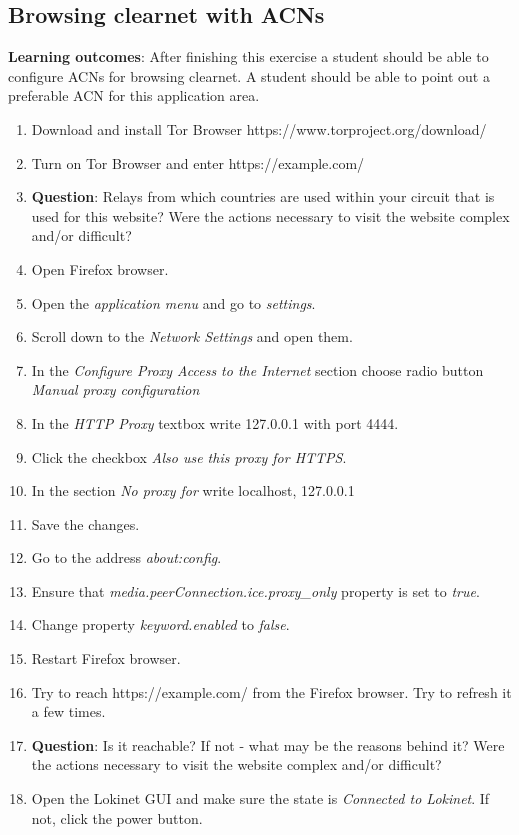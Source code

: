\subsection{Browsing clearnet with ACNs}
\textbf{Learning outcomes}: After finishing this exercise a student should be able to configure ACNs for browsing clearnet. A student should be able to point out a preferable ACN for this application area.
\begin{enumerate}
    \item Download and install Tor Browser https://www.torproject.org/download/
    \item Turn on Tor Browser and enter https://example.com/
    \item \textbf{Question}: Relays from which countries are used within your circuit that is used for this website? Were the actions necessary to visit the website complex and/or difficult?
    \item Open Firefox browser.
    \item Open the \textit{application menu} and go to \textit{settings}.
    \item Scroll down to the \textit{Network Settings} and open them.
    \item In the \textit{Configure Proxy Access to the Internet} section choose radio button \textit{Manual proxy configuration }
    \item In the \textit{HTTP Proxy} textbox write 127.0.0.1 with port 4444.
    \item Click the checkbox \textit{Also use this proxy for HTTPS}.
    \item In the section \textit{No proxy for} write localhost, 127.0.0.1
    \item Save the changes.
    \item Go to the address \textit{about:config}.
    \item Ensure that \textit{media.peerConnection.ice.proxy\_only} property is set to \textit{true}.
    \item Change property \textit{keyword.enabled} to \textit{false}.
    \item Restart Firefox browser.
    \item Try to reach https://example.com/ from the Firefox browser. Try to refresh it a few times.
    \item \textbf{Question}: Is it reachable? If not - what may be the reasons behind it? Were the actions necessary to visit the website complex and/or difficult?
    \item Open the Lokinet GUI and make sure the state is \textit{Connected to Lokinet}. If not, click the power button.

\end{enumerate}
